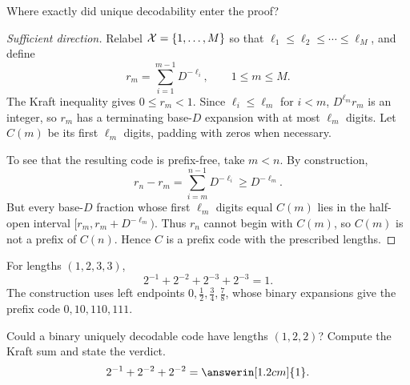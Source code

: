 \begin{yourturn}
Where exactly did unique decodability enter the proof?
\ifshowanswers\else\workspace[2]\fi
{}
\end{yourturn}


\begin{proof}[Sufficient direction]
Relabel $\mathcal{X}=\{1,\ldots,M\}$ so that
$\ell_1\le\ell_2\le\cdots\le\ell_M$, and define
\[
  r_m=\sum_{i=1}^{m-1}D^{-\ell_i},\qquad 1\le m\le M.
\]
The Kraft inequality gives $0\le r_m<1$. Since $\ell_i\le\ell_m$ for $i<m$,
$D^{\ell_m}r_m$ is an integer, so $r_m$ has a terminating base-$D$ expansion
with at most $\ell_m$ digits. Let $C(m)$ be its first $\ell_m$ digits, padding
with zeros when necessary.

To see that the resulting code is prefix-free, take $m<n$. By construction,
\[
  r_n-r_m=\sum_{i=m}^{n-1}D^{-\ell_i}\ge D^{-\ell_m}.
\]
But every base-$D$ fraction whose first $\ell_m$ digits equal $C(m)$ lies in
the half-open interval $[r_m,r_m+D^{-\ell_m})$. Thus $r_n$ cannot begin with
$C(m)$, so $C(m)$ is not a prefix of $C(n)$. Hence $C$ is a prefix code with
the prescribed lengths.
\end{proof}

\begin{example}
For lengths $(1,2,3,3)$,
\[
  2^{-1}+2^{-2}+2^{-3}+2^{-3}=1.
\]
The construction uses left endpoints $0,\tfrac12,\tfrac34,\tfrac78$, whose
binary expansions give the prefix code $0,10,110,111$.
\end{example}

\begin{yourturn}
Could a binary uniquely decodable code have lengths $(1,2,2)$? Compute the
Kraft sum and state the verdict.
\[
  2^{-1}+2^{-2}+2^{-2}=\answerin[1.2cm]{1}.
\]
\end{yourturn}

\vspace{1.2cm}
